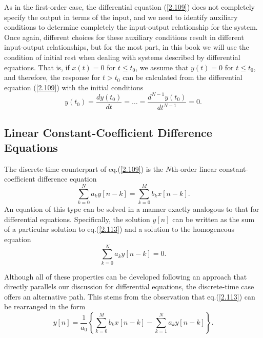 \documentclass[a4paper,twoside]{book}
\begin{document}
As in the first-order case, the differential equation (\ref{2.109}) does not completely specify the output in terms of the input, and we need to identify auxiliary conditions to determine completely the input-output relationship for the system. Once again, different choices for these auxiliary conditions result in different input-output relationships, but for the most part, in this book we will use the condition of initial rest when dealing with systems described by differential equations. That is, if $x(t)=0$ for $t\le t_0$, we assume that $y(t)=0$ for $t\le t_0$, and therefore, the response for $t>t_0$ can be calculated from the differential equation (\ref{2.109}) with the initial conditions
\begin{equation}
    y\left(t_0\right)=\frac{dy\left(t_0\right)}{dt}=\ldots=\frac{d^{N-1}y\left(t_0\right)}{dt^{N-1}}=0.
    \label{2.112}
\end{equation}

\subsection{Linear Constant-Coefficient Difference Equations}

The discrete-time counterpart of eq.\;(\ref{2.109}) is the $N$th-order linear constant-coefficient difference equation
\begin{equation}
    \sum_{k=0}^Na_ky[n-k]=\sum_{k=0}^Mb_kx[n-k].
    \label{2.113}
\end{equation}
An equation of this type can be solved in a manner exactly analogous to that for differential equations. Specifically, the solution $y[n]$ can be written as the sum of a particular solution to eq.\;(\ref{2.113}) and a solution to the homogeneous equation
\begin{equation}
    \sum_{k=0}^Na_ky[n-k]=0.
    \label{2.114}
\end{equation}

Although all of these properties can be developed following an approach that directly parallels our discussion for differential equations, the discrete-time case offers an alternative path. This stems from the observation that eq.\;(\ref{2.113}) can be rearranged in the form
\begin{equation}
    y[n] = \frac{1}{a_0}\left\{\sum_{k=0}^Mb_kx[n-k]-\sum_{k=1}^Na_ky[n-k]\right\}.
    \label{2.115}
\end{equation}
\end{document}
